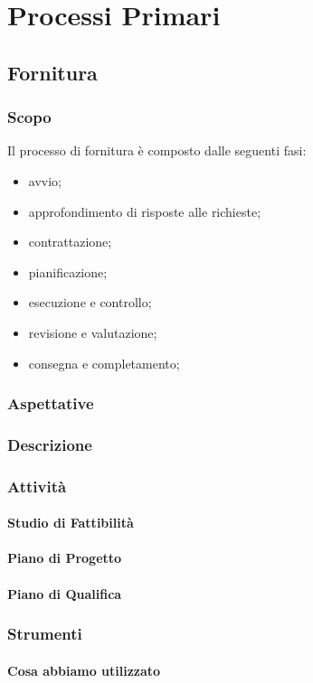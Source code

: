 \section{Processi Primari}
	\subsection{Fornitura}
		\subsubsection{Scopo}
		Il processo di fornitura è composto dalle seguenti fasi:
		\begin{itemize}
			\item avvio;
			\item approfondimento di risposte alle richieste;
			\item contrattazione;
			\item pianificazione;
			\item esecuzione e controllo;
			\item revisione e valutazione;
			\item consegna e completamento;
		\end{itemize}
		\subsubsection{Aspettative}
		\subsubsection{Descrizione}
		\subsubsection{Attività}
			\paragraph{Studio di Fattibilità}
			\paragraph{Piano di Progetto}
			\paragraph{Piano di Qualifica}
		\subsubsection{Strumenti}
			\paragraph{Cosa abbiamo utilizzato}
